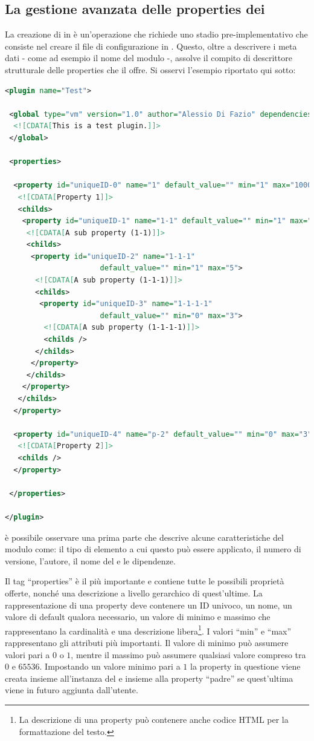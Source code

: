\subsection{La gestione avanzata delle properties dei \plugin{}}
La creazione di \plugin{} in \visualnetkit{} è un'operazione che richiede uno stadio pre-implementativo che consiste nel creare il file di configurazione in \xml{}. Questo, oltre a descrivere i meta dati - come ad esempio il nome del modulo -, assolve il compito di descrittore strutturale delle properties che il \plugin{} offre.
Si osservi l'esempio riportato qui sotto:
\begin{lstlisting}[language=xml]
<plugin name="Test">
 
 <global type="vm" version="1.0" author="Alessio Di Fazio" dependencies="">
  <![CDATA[This is a test plugin.]]>
 </global>
 
 <properties>
  
  <property id="uniqueID-0" name="1" default_value="" min="1" max="1000">
   <![CDATA[Property 1]]>
   <childs>
    <property id="uniqueID-1" name="1-1" default_value="" min="1" max="2">
     <![CDATA[A sub property (1-1)]]>
     <childs>
      <property id="uniqueID-2" name="1-1-1"
                      default_value="" min="1" max="5">
       <![CDATA[A sub property (1-1-1)]]>
       <childs>
        <property id="uniqueID-3" name="1-1-1-1"
                      default_value="" min="0" max="3">
         <![CDATA[A sub property (1-1-1-1)]]>
         <childs />
       </childs>
      </property>
     </childs>
    </property> 
   </childs>
  </property>
  
  <property id="uniqueID-4" name="p-2" default_value="" min="0" max="3">
   <![CDATA[Property 2]]>
   <childs />
  </property>
  
 </properties>
 
</plugin>
\end{lstlisting}
è possibile osservare una prima parte che descrive alcune caratteristiche del modulo come: il tipo di elemento a cui questo può essere applicato, il numero di versione, l'autore, il nome del \plugin{} e le dipendenze.

Il tag ``properties'' è il più importante e contiene tutte le possibili proprietà offerte, nonché una descrizione a livello gerarchico di quest'ultime. La rappresentazione di una property deve contenere un ID univoco, un nome, un valore di default qualora necessario, un valore di minimo e massimo che rappresentano la cardinalità e una descrizione libera\footnote{La descrizione di una property può contenere anche codice HTML per la formattazione del testo.}. I valori ``min'' e ``max'' rappresentano gli attributi più importanti. Il valore di minimo può assumere valori pari a $0$ o $1$, mentre il massimo può assumere qualsiasi valore compreso tra $0$ e $65536$. Impostando un valore minimo pari a $1$ la property in questione viene creata insieme all'instanza del \plugin{} e insieme alla property ``padre'' se quest'ultima viene in futuro aggiunta dall'utente.

